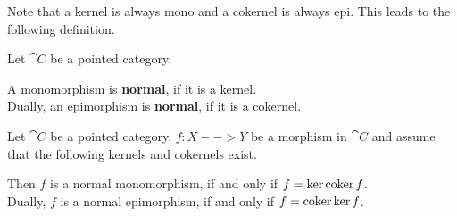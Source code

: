 	Note that a kernel is always mono and a cokernel is always epi. This leads to the following definition.

	\begin{definition}
		Let $\cat{C}$ be a pointed category.

		A monomorphism is \textbf{normal}, if it is a kernel.\\
		Dually, an epimorphism is \textbf{normal}, if it is a cokernel.
	\end{definition}

	\begin{lemma}
		Let $\cat{C}$ be a pointed category, $f:X-->Y$ be a morphism in $\cat{C}$ and assume that the following kernels and cokernels exist.

		Then $f$ is a normal monomorphism, if and only if $f = \ker \operatorname{coker} f$.\\
		Dually, $f$ is a normal epimorphism, if and only if $f = \operatorname{coker} \ker f$.
	\end{lemma}

